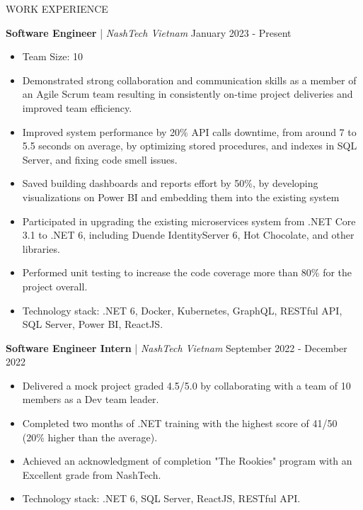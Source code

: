 \begin{rSection}{WORK EXPERIENCE}

    \quad\textbf{Software Engineer} | \textit{NashTech Vietnam} \hfill January 2023 - Present\\
    \begin{itemize}
        \itemsep 0pt {} \vspace{-1em}
        \item Team Size: 10
        \item Demonstrated strong collaboration and communication skills as a member of an Agile Scrum team
              resulting in consistently on-time project deliveries and improved team efficiency.
        \item Improved system performance by 20\% API calls downtime, from around 7 to 5.5 seconds on average,
              by optimizing stored procedures, and indexes in SQL Server, and fixing code smell issues.
        \item Saved building dashboards and reports effort by 50\%, by developing visualizations on Power BI and embedding them into the existing system
        \item Participated in upgrading the existing microservices system from .NET Core 3.1 to .NET 6,
              including Duende IdentityServer 6, Hot Chocolate, and other libraries.
        \item Performed unit testing to increase the code coverage more than 80\% for the project overall.
        \item Technology stack: .NET 6, Docker, Kubernetes, GraphQL, RESTful API, SQL Server, Power BI, ReactJS.
    \end{itemize}

    \vspace{1em}

    \quad\textbf{Software Engineer Intern} | \textit{NashTech Vietnam} \hfill September 2022 - December 2022\\
    \begin{itemize}
        \itemsep 0pt {} \vspace{-1em}
        \item Delivered a mock project graded 4.5/5.0 by collaborating with a team of 10 members as a Dev team leader.
        \item Completed two months of .NET training with the highest score of 41/50 (20\% higher than the average).
        \item Achieved an acknowledgment of completion "The Rookies" program with an Excellent grade from NashTech.
        \item Technology stack: .NET 6, SQL Server, ReactJS, RESTful API.
    \end{itemize}


\end{rSection}
